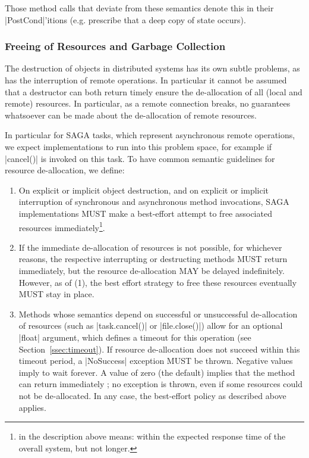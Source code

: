    Those method calls that deviate from these semantics denote
   this in their |PostCond|'itions (e.g. prescribe
   that a deep copy of state occurs).


  \subsubsection{Freeing of Resources and Garbage Collection}
  \label{ssec:garbage}

   The destruction of objects in distributed systems has its own
   subtle problems, as has the interruption of remote
   operations.  In particular it cannot be assumed that a
   destructor can both return timely  ensure the
   de-allocation of all (local and remote) resources.  In
   particular, as a remote connection breaks, no guarantees
   whatsoever can be made about the de-allocation of remote
   resources.

   In particular for SAGA tasks, which represent asynchronous
   remote operations, we expect implementations to run into this
   problem space, for example if |cancel()| is invoked on this
   task.  To have common semantic guidelines for resource
   de-allocation, we define:

   \begin{enumerate}

     \item On explicit or implicit object destruction, and on
     explicit or implicit interruption of synchronous and
     asynchronous method invocations, SAGA implementations MUST
     make a best-effort attempt to free associated resources
     immediately\footnote{ in the description
     above means: within the expected response time of the
     overall system, but not longer.}.
   
     \item If the immediate de-allocation of resources is not
     possible, for whichever reasons, the respective
     interrupting or destructing methods MUST return
     immediately, but the resource de-allocation MAY be delayed
     indefinitely.  However, as of (1), the best effort strategy
     to free these resources eventually MUST stay in place.

     \item Methods whose semantics depend on successful or
     unsuccessful de-allo\-cation of resources (such as
     |task.cancel()| or |file.close()|) allow for an optional
     |float| argument, which defines a timeout for this operation
     (see Section~\ref{ssec:timeout}).  If resource
     de-allocation does not succeed within this timeout period,
     a |NoSuccess| exception MUST be thrown.  Negative values
     imply to wait forever. A value of zero (the default)
     implies that the method can return immediately%
     ; no exception is thrown, even if
     some resources could not be de-allocated.  In any case, the
     best-effort policy as described above applies.

   \end{enumerate}

